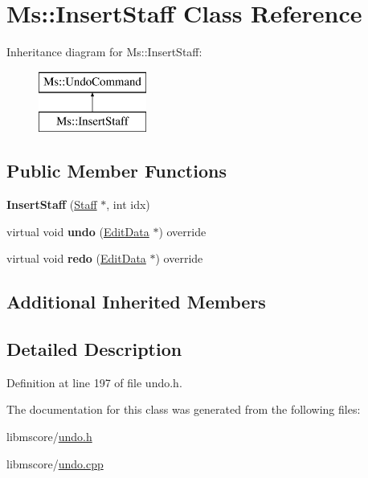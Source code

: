\hypertarget{class_ms_1_1_insert_staff}{}\section{Ms\+:\+:Insert\+Staff Class Reference}
\label{class_ms_1_1_insert_staff}
Inheritance diagram for Ms\+:\+:Insert\+Staff\+:\begin{figure}[H]
\begin{center}
\leavevmode
\includegraphics[height=2.000000cm]{class_ms_1_1_insert_staff}
\end{center}
\end{figure}
\subsection*{Public Member Functions}
\begin{DoxyCompactItemize}
\item 
\mbox{\label{class_ms_1_1_insert_staff_a20468d34c1e856ebc71e9d2554deca8d}} 
{\bfseries Insert\+Staff} (\hyperlink{class_ms_1_1_staff}{Staff} $\ast$, int idx)
\item 
\mbox{\label{class_ms_1_1_insert_staff_a8277b8b44de2d04c6c23676b8e4bc601}} 
virtual void {\bfseries undo} (\hyperlink{class_ms_1_1_edit_data}{Edit\+Data} $\ast$) override
\item 
\mbox{\label{class_ms_1_1_insert_staff_a43c7d604cfba1aefd9a1b02bf0eca847}} 
virtual void {\bfseries redo} (\hyperlink{class_ms_1_1_edit_data}{Edit\+Data} $\ast$) override
\end{DoxyCompactItemize}
\subsection*{Additional Inherited Members}


\subsection{Detailed Description}


Definition at line 197 of file undo.\+h.



The documentation for this class was generated from the following files\+:\begin{DoxyCompactItemize}
\item 
libmscore/\hyperlink{undo_8h}{undo.\+h}\item 
libmscore/\hyperlink{undo_8cpp}{undo.\+cpp}\end{DoxyCompactItemize}
